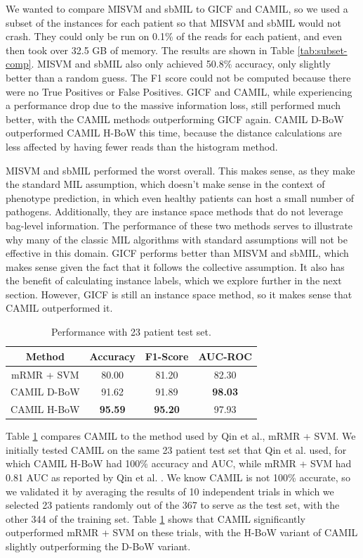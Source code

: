 We wanted to compare MISVM and sbMIL to GICF and CAMIL, so we used a subset of the instances for each patient so that MISVM and sbMIL would not crash. They could only be run on 0.1\% of the reads for each patient, and even then took over 32.5 GB of memory. The results are shown in Table \ref{tab:subset-comp}. MISVM and sbMIL also only achieved 50.8\% accuracy, only slightly better than a random guess. The F1 score could not be computed because there were no True Positives or False Positives. GICF and CAMIL, while experiencing a performance drop due to the massive information loss, still performed much better, with the CAMIL methods outperforming GICF again. CAMIL D-BoW outperformed CAMIL H-BoW this time, because the distance calculations are less affected by having fewer reads than the histogram method.

MISVM and sbMIL performed the worst overall. This makes sense, as they make the standard MIL assumption, which doesn't make sense in the context of phenotype prediction, in which even healthy patients can host a small number of pathogens. Additionally, they are instance space methods that do not leverage bag-level information. The performance of these two methods serves to illustrate why many of the classic MIL algorithms with standard assumptions will not be effective in this domain. GICF performs better than MISVM and sbMIL, which makes sense given the fact that it follows the collective assumption. It also has the benefit of calculating instance labels, which we explore further in the next section. However, GICF is still an instance space method, so it makes sense that CAMIL outperformed it.

\begin{table}[h]
\begin{center}
\caption{Performance with 23 patient test set.} 
\label{tab:test-comp}
\begin{tabular}{|c|ccc|}\hline
Method & Accuracy & F1-Score & AUC-ROC\\\hline
mRMR + SVM & 80.00 & 81.20 & 82.30\\\hline 
CAMIL D-BoW & 91.62 & 91.89 & \bf{98.03}\\\hline
CAMIL H-BoW & \bf{95.59} & \bf{95.20} & 97.93\\\hline
\end{tabular}
\end{center}
\end{table}

Table \ref{tab:test-comp} compares CAMIL to the method used by Qin et al., mRMR + SVM. We initially tested CAMIL on the same 23 patient test set that Qin et al. used, for which CAMIL H-BoW had 100\% accuracy and AUC, while mRMR + SVM had 0.81 AUC as reported by Qin et al. \cite{qin041012}. We know CAMIL is not 100\% accurate, so we validated it by averaging the results of 10 independent trials in which we selected 23 patients randomly out of the 367 to serve as the test set, with the other 344 of the training set. Table \ref{tab:test-comp} shows that CAMIL significantly outperformed mRMR + SVM on these trials, with the H-BoW variant of CAMIL slightly outperforming the D-BoW variant.


